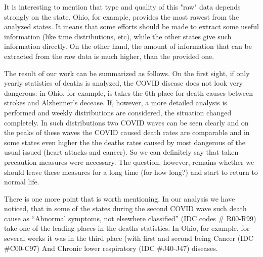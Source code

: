 \documentclass[conference]{IEEEtran}
\begin{document}
It is interesting to mention that type and quality of this "raw" data depends strongly on the state. Ohio, for example, provides the most rawest from the analyzed states. It means that some efforts should be made to extract some useful information (like time distributions, etc), while the other states give such information directly. On the other hand, the amount of information that can be extracted from the raw data is much higher, than the provided one.

The result of our work can be summarized as follows. On the first sight, if only yearly statistics of deaths is analyzed, the COVID disease does not look very dangerous: in Ohio, for example, is takes the 6th place for death causes between strokes and Alzheimer’s decease. If, however, a more detailed analysis is performed and weekly distributions are considered, the situation changed completely. In such distributions two COVID waves can be seen clearly and on the peaks of these waves the COVID caused death rates are comparable and in some states even higher the the deaths rates caused by most dangerous of the usual issued (heart attacks and cancer). So we can definitely say that taken precaution measures were necessary. The question, however, remains whether we should leave these measures for a long time (for how long?) and  start to return to normal life.

There is one more point that is worth mentioning. In our analysis we have noticed, that in some of the states during the second COVID wave such death cause as “Abnormal symptoms, not elsewhere classified” (IDC codes \# R00-R99) take one of the leading places in the deaths statistics. In Ohio, for example, for several weeks it was in the third place (with first and second being Cancer (IDC \#C00-C97) And Chronic lower respiratory (IDC \#J40-J47) diseases.





\end{document}
